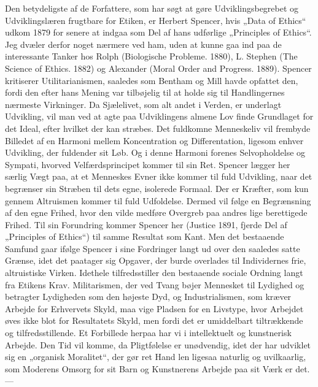 \documentclass[12pt,a4paper,openany]{book}
\newcommand{\opage}[1]{\marginnote{\footnotesize\textit{[#1]}}}
\begin{document}
Den betydeligste af de Forfattere, som har søgt at gøre Udviklingsbegrebet
og Udviklingslæren frugtbare for Etiken, er Herbert
Spencer, hvis „Data of Ethics“ udkom 1879 for senere at indgaa
som Del af hans udførlige „Principles of Ethics“. Jeg dvæler derfor
noget nærmere ved ham, uden at kunne gaa ind paa de interessante
Tanker hos Rolph (Biologische Probleme. 1880), L. Stephen (The
Science of Ethics. 1882) og Alexander (Moral Order and Progress.
1889). Spencer kritiserer Utilitarianismen, saaledes som Bentham og Mill
havde opfattet den, fordi den efter hans Mening var tilbøjelig til at
holde sig til Handlingernes nærmeste Virkninger. Da Sjælelivet, som
alt andet i Verden, er underlagt Udvikling, vil man ved at agte paa
Udviklingens almene Lov finde Grundlaget for det Ideal, efter hvilket
der kan stræbes. Det fuldkomne Menneskeliv vil frembyde Billedet
af en Harmoni mellem Koncentration og Differentation, ligesom
enhver Udvikling, der fuldender sit Løb. Og i denne Harmoni forenes
Selvopholdelse og Sympati, hvorved Velfærdsprincipet kommer
til sin Ret. Spencer lægger her særlig Vægt paa, at et Menneskes Evner
ikke kommer til fuld Udvikling, naar det begrænser sin Stræben
til dets egne, isolerede Formaal. Der er Kræfter, som kun gennem
Altruismen kommer til fuld Udfoldelse. Dermed vil følge en
Begrænsning af den egne Frihed, hvor den vilde medføre Overgreb
paa andres lige berettigede Frihed. Til sin Forundring kommer Spencer
her (Justice 1891, fjerde Del af „Principles of Ethics“) til samme
Resultat som Kant. Men det bestaaende Samfund gaar ifølge Spencer
i sine Fordringer langt ud over den saaledes satte Grænse, idet det
paatager sig Opgaver, der burde overlades til Individernes frie, altruistiske
Virken. Idethele tilfredsstiller den bestaaende sociale Ordning
langt fra Etikens Krav. Militarismen, der ved Tvang bøjer Mennesket
til Lydighed og betragter Lydigheden som den højeste Dyd,
og Industrialismen, som kræver Arbejde for Erhvervets Skyld, maa
vige Pladsen for en Livstype, hvor Arbejdet øves ikke blot for Resultatets
Skyld, men fordi det er umiddelbart tiltrækkende og tilfredsstillende.
Et Forbillede herpaa har vi i intellektuelt og kunstnerisk
Arbejde. Den Tid vil komme, da Pligtfølelse er unødvendig,
idet der har udviklet sig en „organisk Moralitet“, der gør ret Hand%
\opage{77}len ligesaa naturlig og uvilkaarlig, som Moderens Omsorg for sit
Barn og Kunstnerens Arbejde paa sit Værk er det. ---
\end{document}
